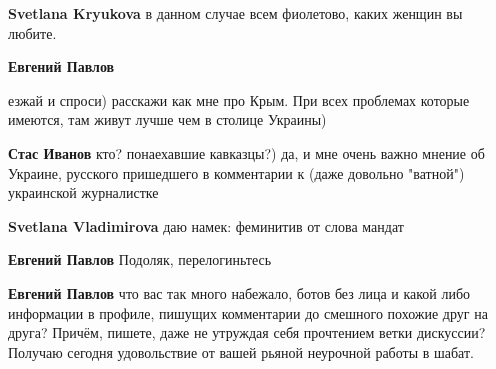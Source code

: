 \begin{itemize}
\begin{itemize}
\textbf{Svetlana Kryukova} в данном случае всем фиолетово, каких женщин вы любите.

 
\textbf{Евгений Павлов} 

езжай и спроси) расскажи как мне про Крым. При всех проблемах которые имеются,
там живут лучше чем в столице Украины)

 
\textbf{Стас Иванов} кто? понаехавшие кавказцы?) да, и мне очень важно мнение об Украине, русского пришедшего в комментарии к (даже довольно "ватной") украинской журналистке

 

\textbf{Svetlana Vladimirova} даю намек: феминитив от слова мандат

 

\textbf{Евгений Павлов} Подоляк, перелогиньтесь

 
\textbf{Евгений Павлов} что вас так много набежало, ботов без лица и какой либо информации в профиле, пишущих комментарии до смешного похожие друг на друга? Причём, пишете, даже не утруждая себя прочтением ветки дискуссии? \Laughey[1.0][white] Получаю сегодня удовольствие от вашей рьяной неурочной работы в шабат.

 

\end{itemize}
\end{itemize}
